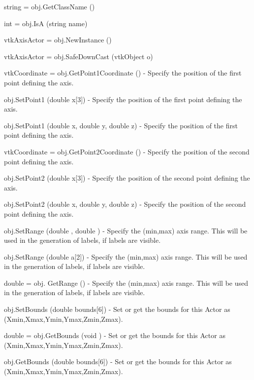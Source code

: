 \begin{DoxyItemize}
\item {\ttfamily string = obj.\-Get\-Class\-Name ()}  
\item {\ttfamily int = obj.\-Is\-A (string name)}  
\item {\ttfamily vtk\-Axis\-Actor = obj.\-New\-Instance ()}  
\item {\ttfamily vtk\-Axis\-Actor = obj.\-Safe\-Down\-Cast (vtk\-Object o)}  
\item {\ttfamily vtk\-Coordinate = obj.\-Get\-Point1\-Coordinate ()} -\/ Specify the position of the first point defining the axis.  
\item {\ttfamily obj.\-Set\-Point1 (double x\mbox{[}3\mbox{]})} -\/ Specify the position of the first point defining the axis.  
\item {\ttfamily obj.\-Set\-Point1 (double x, double y, double z)} -\/ Specify the position of the first point defining the axis.  
\item {\ttfamily vtk\-Coordinate = obj.\-Get\-Point2\-Coordinate ()} -\/ Specify the position of the second point defining the axis.  
\item {\ttfamily obj.\-Set\-Point2 (double x\mbox{[}3\mbox{]})} -\/ Specify the position of the second point defining the axis.  
\item {\ttfamily obj.\-Set\-Point2 (double x, double y, double z)} -\/ Specify the position of the second point defining the axis.  
\item {\ttfamily obj.\-Set\-Range (double , double )} -\/ Specify the (min,max) axis range. This will be used in the generation of labels, if labels are visible.  
\item {\ttfamily obj.\-Set\-Range (double a\mbox{[}2\mbox{]})} -\/ Specify the (min,max) axis range. This will be used in the generation of labels, if labels are visible.  
\item {\ttfamily double = obj. Get\-Range ()} -\/ Specify the (min,max) axis range. This will be used in the generation of labels, if labels are visible.  
\item {\ttfamily obj.\-Set\-Bounds (double bounds\mbox{[}6\mbox{]})} -\/ Set or get the bounds for this Actor as (Xmin,Xmax,Ymin,Ymax,Zmin,Zmax).  
\item {\ttfamily double = obj.\-Get\-Bounds (void )} -\/ Set or get the bounds for this Actor as (Xmin,Xmax,Ymin,Ymax,Zmin,Zmax).  
\item {\ttfamily obj.\-Get\-Bounds (double bounds\mbox{[}6\mbox{]})} -\/ Set or get the bounds for this Actor as (Xmin,Xmax,Ymin,Ymax,Zmin,Zmax).  

\end{DoxyItemize}
